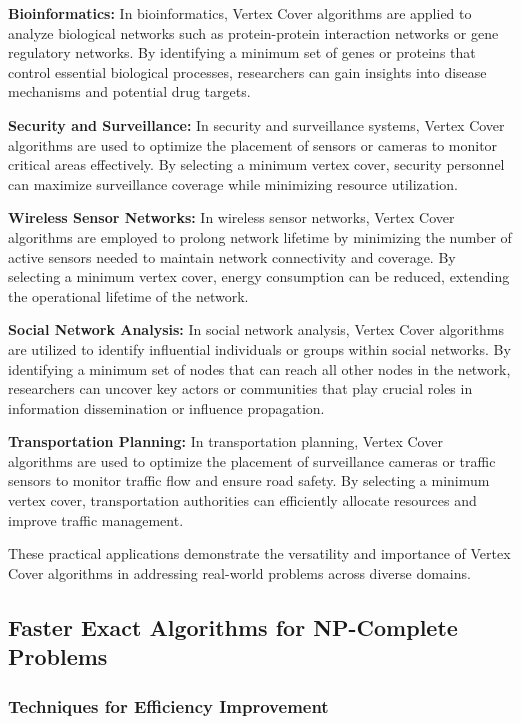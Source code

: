 \documentclass[12pt]{book} %
\begin{document}
\textbf{Bioinformatics:} In bioinformatics, Vertex Cover algorithms are applied to analyze biological networks such as protein-protein interaction networks or gene regulatory networks. By identifying a minimum set of genes or proteins that control essential biological processes, researchers can gain insights into disease mechanisms and potential drug targets.

\textbf{Security and Surveillance:} In security and surveillance systems, Vertex Cover algorithms are used to optimize the placement of sensors or cameras to monitor critical areas effectively. By selecting a minimum vertex cover, security personnel can maximize surveillance coverage while minimizing resource utilization.

\textbf{Wireless Sensor Networks:} In wireless sensor networks, Vertex Cover algorithms are employed to prolong network lifetime by minimizing the number of active sensors needed to maintain network connectivity and coverage. By selecting a minimum vertex cover, energy consumption can be reduced, extending the operational lifetime of the network.

\textbf{Social Network Analysis:} In social network analysis, Vertex Cover algorithms are utilized to identify influential individuals or groups within social networks. By identifying a minimum set of nodes that can reach all other nodes in the network, researchers can uncover key actors or communities that play crucial roles in information dissemination or influence propagation.

\textbf{Transportation Planning:} In transportation planning, Vertex Cover algorithms are used to optimize the placement of surveillance cameras or traffic sensors to monitor traffic flow and ensure road safety. By selecting a minimum vertex cover, transportation authorities can efficiently allocate resources and improve traffic management.

These practical applications demonstrate the versatility and importance of Vertex Cover algorithms in addressing real-world problems across diverse domains.


\subsection{Faster Exact Algorithms for NP-Complete Problems} 

\subsubsection{Techniques for Efficiency Improvement}
\end{document}
